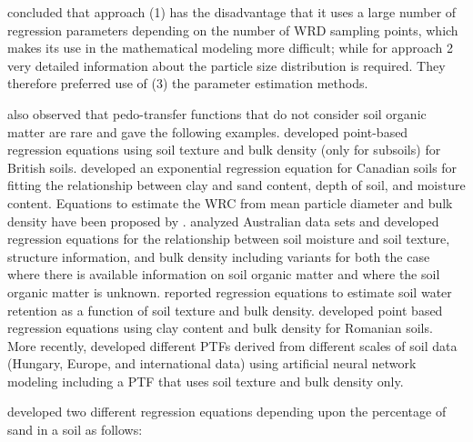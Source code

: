 \documentclass[graybox,natbib,nospthms,UStrade]{svmono}
\begin{document}
\citet{Zacharias2007SSSAJ} concluded that approach (1) has the disadvantage
that it uses a large number of regression parameters depending on the
number of WRD sampling points, which makes its use in the mathematical
modeling more difficult; while for approach 2 very detailed information
about the particle size distribution is required. They therefore
preferred use of (3) the parameter estimation methods.

\citet{Zacharias2007SSSAJ} also observed that pedo-transfer functions that do
not consider soil organic matter are rare and gave the following
examples. \citet{Hall1977} developed point-based regression equations using
soil texture and bulk density (only for subsoils) for British soils.
\citet{Oosterveld1980CAE} developed an exponential regression equation for
Canadian soils for fitting the relationship between clay and sand
content, depth of soil, and moisture content. Equations to estimate the
WRC from mean particle diameter and bulk density have been proposed by
\citet{Campbell1989}. \citet{Williams1992} analyzed Australian data sets and developed
regression equations for the relationship between soil moisture and soil
texture, structure information, and bulk density including variants for
both the case where there is available information on soil organic
matter and where the soil organic matter is unknown. \citet{Rawls1989} reported
regression equations to estimate soil water retention as a function of
soil texture and bulk density. \citet{Canarache1993ST} developed point based
regression equations using clay content and bulk density for Romanian
soils. More recently, \citet{Nemes2003SSSAJ} developed different PTFs derived
from different scales of soil data (Hungary, Europe, and international
data) using artificial neural network modeling including a PTF that uses
soil texture and bulk density only.

\citet{Zacharias2007SSSAJ} developed two different regression equations
depending upon the percentage of sand in a soil as follows:
\end{document}
